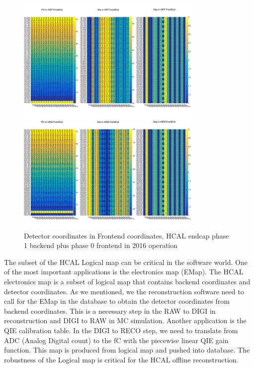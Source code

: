 \begin{figure}[htbp]
 \begin{center}
  \includegraphics[width=0.8\textwidth]{figures/c3/c3_cms_hcalhelmapfegeo.png}
 \end{center}
 \caption{Detector coordinates in Frontend coordinates, HCAL endcap phase 1 backend plus phase 0 frontend in 2016 operation}
 \label{fig:c3cmshcalhelmapfegeo}
\end{figure}


The subset of the HCAL Logical map can be critical in the software world. One of the most important applications is the electronics map (EMap). The HCAL electronics map is a subset of logical map that contains backend coordinates and detector coordinates. As we mentioned, we the reconstruction software need to call for the EMap in the database to obtain the detector coordinates from backend coordinates. This is a necessary step in the RAW to DIGI in reconstruction and DIGI to RAW in MC simulation. Another application is the QIE calibration table. In the DIGI to RECO step, we need to translate from ADC (Analog Digital count) to the fC with the piecewise linear QIE gain function. This map is produced from logical map and pushed into database. The robustness of the Logical map is critical for the HCAL offline reconstruction. 

